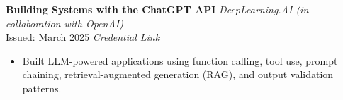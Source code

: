 \documentclass[10pt]{article}
\let\hrefWithoutArrow\href
\renewcommand{\href}[2]{\hrefWithoutArrow{#1}{#2}}
\begin{document}
        \vspace{0.2cm}

        \textbf{Building Systems with the ChatGPT API} \hfill \textit{DeepLearning.AI (in collaboration with OpenAI)}\\
        Issued: March 2025 \hfill \hrefWithoutArrow{https://learn.deeplearning.ai/accomplishments/7e14d43c-9777-4220-8482-3f06bde4be5c?usp=sharing}{\textit{Credential Link}}
        \begin{itemize}[leftmargin=*, topsep=2pt, itemsep=2pt]
            \item Built LLM-powered applications using function calling, tool use, prompt chaining, retrieval-augmented generation (RAG), and output validation patterns.
        \end{itemize}
\end{document}
